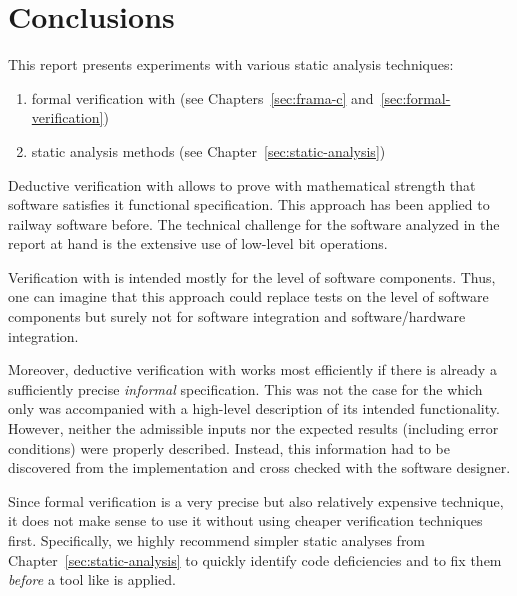 
\chapter{Conclusions}
\label{sec:conclusions}

This report presents experiments with various static analysis techniques:

\begin{enumerate}
\item formal verification with \framacwp (see Chapters~\ref{sec:frama-c}
      and~\ref{sec:formal-verification})
\item static analysis methods (see Chapter~\ref{sec:static-analysis})
\end{enumerate}


Deductive verification with \framacwp allows to prove with mathematical strength
that software satisfies it functional specification.
This approach has been applied to railway software before\cite{INDIN2103-FOKUS}.
The technical challenge for the software analyzed in the report at hand is
the extensive use of low-level bit operations.

Verification with \framacwp is intended mostly for the level of software components.
Thus, one can imagine that this approach could replace tests on the 
level of software components but surely not for software integration
and software\slash hardware integration.

Moreover, deductive verification with \framacwp works most efficiently
if there is already a sufficiently precise \emph{informal} specification.
This was not the case for the \bitwalker which only was accompanied with
a high-level description of its intended functionality.
However, neither the admissible inputs nor the expected results (including error conditions)
were properly described.
Instead, this information had to be discovered from the implementation and cross checked
with the software designer.

Since formal verification is a very precise but also relatively expensive technique,
it does not make sense to use it without using cheaper verification techniques first.
Specifically, we highly recommend  simpler static analyses from 
Chapter~\ref{sec:static-analysis} to quickly identify code deficiencies
and to fix them \emph{before} a tool like \framacwp is applied.


